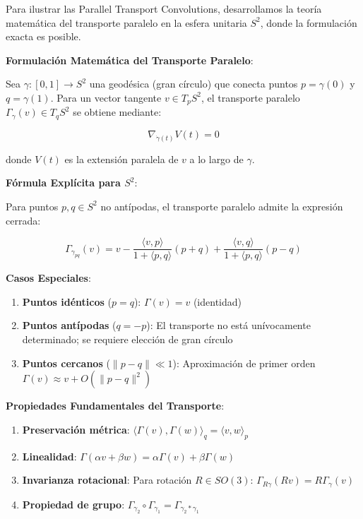 \begin{example}

Para ilustrar las Parallel Transport Convolutions, desarrollamos la teoría matemática del transporte paralelo en la esfera unitaria $S^2$, donde la formulación exacta es posible.

\textbf{Formulación Matemática del Transporte Paralelo}:

Sea $\gamma: [0,1] \to S^2$ una geodésica (gran círculo) que conecta puntos $p = \gamma(0)$ y $q = \gamma(1)$. Para un vector tangente $v \in T_p S^2$, el transporte paralelo $\Gamma_\gamma(v) \in T_q S^2$ se obtiene mediante:

\begin{equation}
\nabla_{\dot{\gamma}(t)} V(t) = 0
\end{equation}

donde $V(t)$ es la extensión paralela de $v$ a lo largo de $\gamma$.

\textbf{Fórmula Explícita para $S^2$}:

Para puntos $p, q \in S^2$ no antípodas, el transporte paralelo admite la expresión cerrada:

\begin{equation}
\Gamma_{\gamma_{pq}}(v) = v - \frac{\langle v, p \rangle}{1 + \langle p, q \rangle}(p + q) + \frac{\langle v, q \rangle}{1 + \langle p, q \rangle}(p - q)
\end{equation}

\textbf{Casos Especiales}:
\begin{enumerate}
    \item \textbf{Puntos idénticos} ($p = q$): $\Gamma(v) = v$ (identidad)
    \item \textbf{Puntos antípodas} ($q = -p$): El transporte no está unívocamente determinado; se requiere elección de gran círculo
    \item \textbf{Puntos cercanos} ($\|p - q\| \ll 1$): Aproximación de primer orden $\Gamma(v) \approx v + O(\|p-q\|^2)$
\end{enumerate}

\textbf{Propiedades Fundamentales del Transporte}:
\begin{enumerate}
    \item \textbf{Preservación métrica}: $\langle \Gamma(v), \Gamma(w) \rangle_q = \langle v, w \rangle_p$
    \item \textbf{Linealidad}: $\Gamma(\alpha v + \beta w) = \alpha \Gamma(v) + \beta \Gamma(w)$
    \item \textbf{Invarianza rotacional}: Para rotación $R \in SO(3)$: $\Gamma_{R\gamma}(Rv) = R\Gamma_\gamma(v)$
    \item \textbf{Propiedad de grupo}: $\Gamma_{\gamma_2} \circ \Gamma_{\gamma_1} = \Gamma_{\gamma_2 * \gamma_1}$
\end{enumerate}


\end{example}
